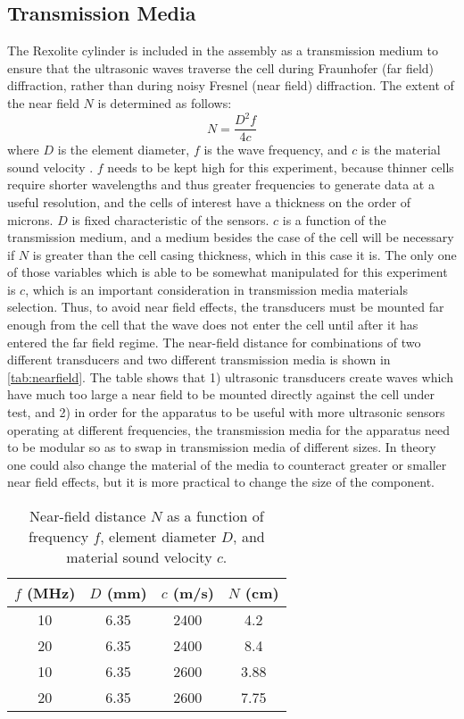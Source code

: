 \subsection{Transmission Media}
The Rexolite cylinder is included in the assembly as a transmission medium to ensure that the ultrasonic waves traverse the cell during Fraunhofer (far field) diffraction, rather than during noisy Fresnel (near field) diffraction. The extent of the near field $N$ is determined as follows:
$$\label{eq:nearfield} N= \frac{D^2 f} {4c} $$
where $D$ is the element diameter, $f$ is the wave frequency, and $c$ is the material sound velocity \cite{OLYMPUS}.
$f$ needs to be kept high for this experiment, because thinner cells require shorter wavelengths and thus greater frequencies to generate data at a useful resolution, and the cells of interest have a thickness on the order of microns. $D$ is fixed characteristic of the sensors. $c$ is a function of the transmission medium, and a medium besides the case of the cell will be necessary if $N$ is greater than the cell casing thickness, which in this case it is. The only one of those variables which is able to be somewhat manipulated for this experiment is $c$, which is an important consideration in transmission media materials selection. 
Thus, to avoid near field effects, the transducers must be mounted far enough from the cell that the wave does not enter the cell until after it has entered the far field regime. The near-field distance for combinations of two different transducers and two different transmission media is shown in \autoref{tab:nearfield}. The table shows that 1) ultrasonic transducers create waves which have much too large a near field to be mounted directly against the cell under test, and 2) in order for the apparatus to be useful with more ultrasonic sensors operating at different frequencies, the transmission media for the apparatus need to be modular so as to swap in transmission media of different sizes. In theory one could also change the material of the media to counteract greater or smaller near field effects, but it is more practical to change the size of the component. 

\begin{table}[h]
    \centering
    \begin{tabular}{c|c|c|c}
         $f$ (MHz) & $D$ (mm) & $c$ (m/s) & $N$ (cm) \\
         \hline
         10 & 6.35 & 2400 & 4.2 \\
         20 & 6.35 & 2400 & 8.4 \\
         10 & 6.35 & 2600 & 3.88 \\
         20 & 6.35 & 2600 & 7.75 \\
    \end{tabular}
    \caption{Near-field distance $N$ as a function of frequency $f$, element diameter $D$, and material sound velocity $c$.}
    \label{tab:nearfield}
\end{table}


